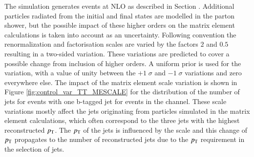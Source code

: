 The \POWHEG simulation generates \ttbar events at NLO as described in Section .
Additional particles radiated from the initial and final states are modelled in the parton shower, but the possible impact of these higher orders on the matrix element calculations is taken into account as an uncertainty.
Following convention  the renormalization and factorisation scales are varied by the factors $2$ and $0.5$ resulting in a two-sided variation.
These variations are predicted to cover a possible change from inclusion of higher orders.
A uniform prior is used for the variation, with a value of unity between the $+1 \; \sigma$ and $-1 \; \sigma$ variations and zero everywhere else.
The impact of the matrix element scale variation is shown in Figure \ref{fig:control_var_TT_MESCALE} for the distribution of the number of jets for events with one b-tagged jet for events in the \emu channel.
These scale variations mostly affect the jets originating from particles simulated in the matrix element calculations, which often correspond to the three jets with the highest reconstructed $p_{\mathrm{T}}$.
The $p_{\mathrm{T}}$ of the jets is influenced by the scale and this change of $p_{\mathrm{T}}$ propagates to the number of reconstructed jets due to the $p_{\mathrm{T}}$ requirement in the selection of jets.


